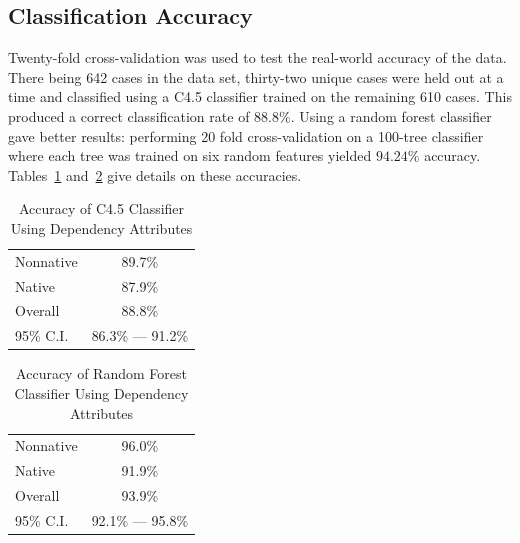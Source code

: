 \documentclass[main.tex]{subfiles}
\begin{document}
\subsection{Classification Accuracy}

Twenty-fold cross-validation was used to test the real-world accuracy of the data. There being 642 cases in the data set, thirty-two unique cases were held out at a time and classified using a C4.5 classifier trained on the remaining 610 cases. This produced a correct classification rate of $88.8\%$. Using a random forest classifier gave better results: performing 20 fold cross-validation on a 100-tree classifier where each tree was trained on six random features yielded $94.24\%$ accuracy. Tables~\ref{table:dep-results-c45} and~\ref{table:dep-results-rf} give details on these accuracies.

\begin{table}[htbp]
\centering
\caption{Accuracy of C4.5 Classifier Using Dependency Attributes}
\begin{tabular}{l c}
\toprule
Nonnative & 89.7\% \\
Native & 87.9\% \\
Overall & 88.8\% \\
95\% C.I.& 86.3\% --- 91.2\%\\
\bottomrule
\end{tabular}
\label{table:dep-results-c45}
\end{table}

\begin{table}[htbp]
\centering
\caption{Accuracy of Random Forest Classifier Using Dependency Attributes}
\begin{tabular}{l c}
\toprule
Nonnative & 96.0\% \\
Native & 91.9\% \\
Overall & 93.9\% \\
95\% C.I. & 92.1\% --- 95.8\%\\
\bottomrule
\end{tabular}
\label{table:dep-results-rf}
\end{table}

\biblio
\end{document}

